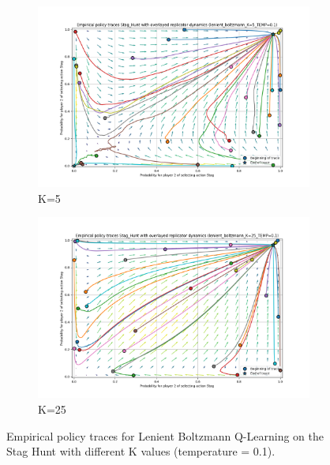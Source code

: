 \documentclass[12pt,a4paper, onecolumn]{exam}
\begin{document}
\begin{appendices}
\begin{figure}[H]
\begin{subfigure}{0.44\textwidth}
            \includegraphics[width=\linewidth]{plots/replicator_trajectoreis_Stag_Hunt_lenient_boltzmann_K=5_TEMP=0.1.png}
            \caption{K=5}
        \end{subfigure}
        \hfill
        \begin{subfigure}{0.44\textwidth}
            \centering
            \includegraphics[width=\linewidth]{plots/replicator_trajectoreis_Stag_Hunt_lenient_boltzmann_K=25_TEMP=0.1.png}
            \caption{K=25}
        \end{subfigure}
        \caption{Empirical policy traces for Lenient Boltzmann Q-Learning on the Stag Hunt with different K values (temperature = 0.1).}
        \label{fig:app_stag_hunt_k_values}
    \end{figure}


\end{appendices}
\end{document}
